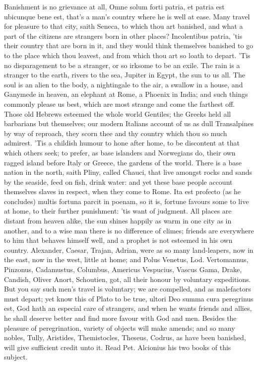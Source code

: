{Banishment is no grievance at all, Omne solum forti patria, \etc{} et
patria est ubicunque bene est, that's a man's country where he is well
at ease. Many travel for pleasure to that city, saith Seneca, to which
thou art banished, and what a part of the citizens are strangers born
in other places? Incolentibus patria, 'tis their country that are
born in it, and they would think themselves banished to go to the place
which thou leavest, and from which thou art so loath to depart. 'Tis no
disparagement to be a stranger, or so irksome to be an exile. The
rain is a stranger to the earth, rivers to the sea, Jupiter in Egypt,
the sun to us all. The soul is an alien to the body, a nightingale to
the air, a swallow in a house, and Ganymede in heaven, an elephant at
Rome, a Phoenix in India; and such things commonly please us best,
which are most strange and come the farthest off. Those old Hebrews
esteemed the whole world Gentiles; the Greeks held all barbarians but
themselves; our modern Italians account of us as dull Transalpines by
way of reproach, they scorn thee and thy country which thou so much
admirest. 'Tis a childish humour to hone after home, to be discontent
at that which others seek; to prefer, as base islanders and Norwegians
do, their own ragged island before Italy or Greece, the gardens of the
world. There is a base nation in the north, saith Pliny, called
Chauci, that live amongst rocks and sands by the seaside, feed on fish,
drink water: and yet these base people account themselves slaves in
respect, when they come to Rome. Ita est profecto (as he concludes)
multis fortuna parcit in poenam, so it is, fortune favours some to live
at home, to their further punishment: 'tis want of judgment. All places
are distant from heaven alike, the sun shines happily as warm in one
city as in another, and to a wise man there is no difference of climes;
friends are everywhere to him that behaves himself well, and a prophet
is not esteemed in his own country. Alexander, Caesar, Trajan, Adrian,
were as so many land-leapers, now in the east, now in the west, little
at home; and Polus Venetus, Lod. Vertomannus, Pinzonus, Cadamustus,
Columbus, Americus Vespucius, Vascus Gama, Drake, Candish, Oliver
Anort, Schoutien, got, all their honour by voluntary expeditions. But
you say such men's travel is voluntary; we are compelled, and as
malefactors must depart; yet know this of Plato to be true,
ultori Deo summa cura peregrinus est, God hath an especial care of
strangers, and when he wants friends and allies, he shall deserve
better and find more favour with God and men. Besides the pleasure of
peregrination, variety of objects will make amends; and so many nobles,
Tully, Aristides, Themistocles, Theseus, Codrus, \etc{} as have been
banished, will give sufficient credit unto it. Read Pet. Alcionius his
two books of this subject.

}
